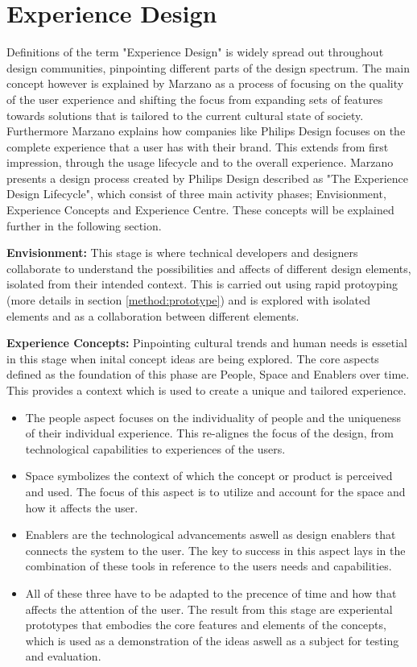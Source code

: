 \section{Experience Design}
Definitions of the term "Experience Design" is widely spread out throughout design communities, pinpointing different parts of the design spectrum. The main concept however is explained by Marzano as a process of focusing on the quality of the user experience and shifting the focus from expanding sets of features towards solutions that is tailored to the current cultural state of society\cite{experience_design:marzano2003new}. Furthermore Marzano explains how companies like Philips Design focuses on the complete experience that a user has with their brand. This extends from first impression, through the usage lifecycle and to the overall experience. Marzano presents a design process created by Philips Design described as "The Experience Design Lifecycle", which consist of three main activity phases; Envisionment, Experience Concepts and Experience Centre. These concepts will be explained further in the following section.

\textbf{Envisionment:}
This stage is where technical developers and designers collaborate to understand the possibilities and affects of different design elements, isolated from their intended context. This is carried out using rapid protoyping (more details in section \ref{method:prototype}) and is explored with isolated elements and as a collaboration between different elements.

\textbf{Experience Concepts:}
Pinpointing cultural trends and human needs is essetial in this stage when inital concept ideas are being explored. The core aspects defined as the foundation of this phase are People, Space and Enablers over time. This provides a context which is used to create a  unique and tailored experience.
\begin{itemize}
  \item The people aspect focuses on the individuality of people and the uniqueness of their individual experience. This re-alignes the focus of the design, from technological capabilities to experiences of the users.
  \item Space symbolizes the context of which the concept or product is perceived and used. The focus of this aspect is to utilize and account for the space and how it affects the user.
  \item Enablers are the technological advancements aswell as design enablers that connects the system to the user. The key to success in this aspect lays in the combination of these tools in reference to the users needs and capabilities.
  \item All of these three have to be adapted to the precence of time and how that affects the attention of the user. The result from this stage are experiental prototypes that embodies the core features and elements of the concepts, which is used as a demonstration of the ideas aswell as a subject for testing and evaluation.
\end{itemize}

